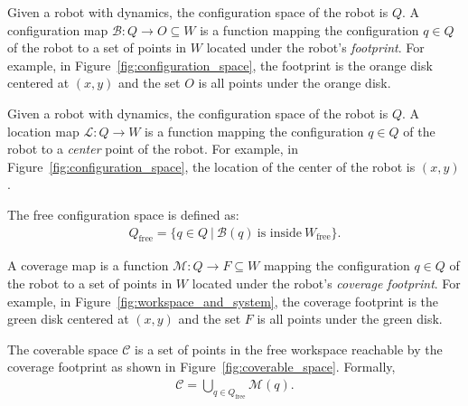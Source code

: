 \documentclass[../main.tex]{subfiles}
\begin{document}
\begin{definition}
\label{definition:c_space_and_map}
Given a robot with dynamics, the configuration space of the robot is $Q$. A configuration map $\mathcal{B}:Q\to O\subseteq W$ is a function mapping the configuration $q\in Q$ of the robot to a set of points in $W$ located under the robot's \emph{footprint}. For example, in Figure~\ref{fig:configuration_space}, the footprint is the orange disk centered at $(x,y)$ and the set $O$ is all points under the orange disk.
\end{definition}

\begin{definition}
\label{definition:location_map}
Given a robot with dynamics, the configuration space of the robot is $Q$. A location map $\mathcal{L}:Q\to W$ is a function mapping the configuration $q\in Q$ of the robot to a \emph{center} point of the robot. For example, in Figure~\ref{fig:configuration_space}, the location of the center of the robot is $(x,y)$.
\end{definition}

\begin{definition}
\label{definition:free_c_space}
The free configuration space is defined as:
	\begin{equation}
	\begin{aligned}
		Q_{\text{free}}=\{q\in Q\ |\ \mathcal{B}(q)\ \text{is inside}\ W_{\text{free}}\}.
	\end{aligned}
	\end{equation}
\end{definition}

\begin{definition}
A coverage map is a function $\mathcal{M}:Q\to F\subseteq W$ mapping the configuration $q\in Q$ of the robot to a set of points in $W$ located under the robot's \emph{coverage footprint}. For example, in Figure~\ref{fig:workspace_and_system}, the coverage footprint is the green disk centered at $(x,y)$ and the set $F$ is all points under the green disk.
\end{definition}

\begin{definition}
The coverable space $\mathcal{C}$ is a set of points in the free workspace reachable by the coverage footprint as shown in Figure~\ref{fig:coverable_space}. Formally,
	\begin{equation}
	\begin{aligned}
		\mathcal{C}=\bigcup_{q\in Q_{\text{free}}}\mathcal{M}(q).
	\end{aligned}
	\end{equation}
\end{definition}
\end{document}

